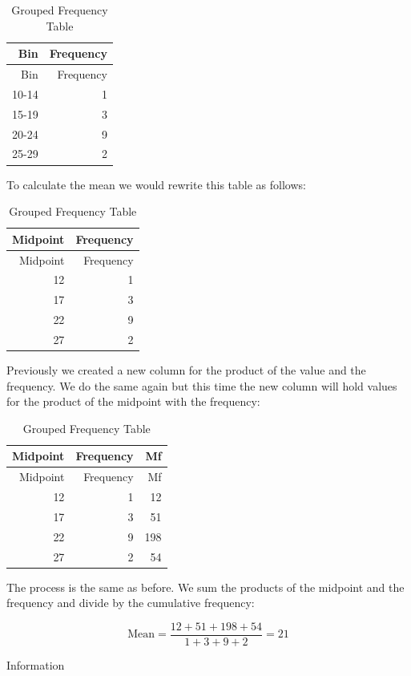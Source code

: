\documentclass[
]{book}
\begin{document}
\begin{longtable}[]{@{}rr@{}}
\caption{\label{tab:table0007}Grouped Frequency Table}\tabularnewline
\toprule
Bin & Frequency \\
\midrule
\endfirsthead
\toprule
Bin & Frequency \\
\midrule
\endhead
10-14 & 1 \\
15-19 & 3 \\
20-24 & 9 \\
25-29 & 2 \\
\bottomrule
\end{longtable}

To calculate the mean we would rewrite this table as follows:

\begin{longtable}[]{@{}rr@{}}
\caption{\label{tab:table00007}Grouped Frequency Table}\tabularnewline
\toprule
Midpoint & Frequency \\
\midrule
\endfirsthead
\toprule
Midpoint & Frequency \\
\midrule
\endhead
12 & 1 \\
17 & 3 \\
22 & 9 \\
27 & 2 \\
\bottomrule
\end{longtable}

Previously we created a new column for the product of the value and the frequency. We do the same again but this time the new column will hold values for the product of the midpoint with the frequency:

\begin{longtable}[]{@{}rrr@{}}
\caption{\label{tab:table000007}Grouped Frequency Table}\tabularnewline
\toprule
Midpoint & Frequency & Mf \\
\midrule
\endfirsthead
\toprule
Midpoint & Frequency & Mf \\
\midrule
\endhead
12 & 1 & 12 \\
17 & 3 & 51 \\
22 & 9 & 198 \\
27 & 2 & 54 \\
\bottomrule
\end{longtable}

The process is the same as before. We sum the products of the midpoint and the frequency and divide by the cumulative frequency:

\[\textrm{Mean}=\frac{12+51+198+54}{1+3+9+2}=21\]

Information
\end{document}
